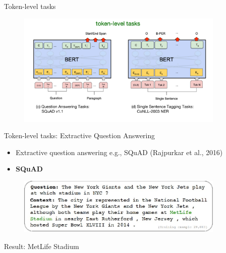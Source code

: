 \documentclass[serif, aspectratio=169]{beamer}
\begin{document}
\begin{frame}{Token-level tasks}
    \begin{figure}
        \centering
        \includegraphics[width=0.9\textwidth]{Figures/token-level-tasks.png}
    \end{figure}
\end{frame}

\begin{frame}{Token-level tasks: Extractive Question Answering}

    \begin{itemize}
        \item Extractive question answering e.g., SQuAD (\textcolor{green!50!black}{Rajpurkar et al., 2016})
    \end{itemize}
    
    \begin{itemize}
        \item[] \setlength{\fboxsep}{2pt}\colorbox{yellow!30}{\textbf{SQuAD}}
    \end{itemize}
    
    \vspace{0.2cm}
    
    \begin{figure}[h]
        \centering
        \includegraphics[width=0.9\textwidth]{Figures/tk-task.png}
    \end{figure}
    
    \hspace{1cm} Result: MetLife Stadium
\end{frame}
\end{document}
